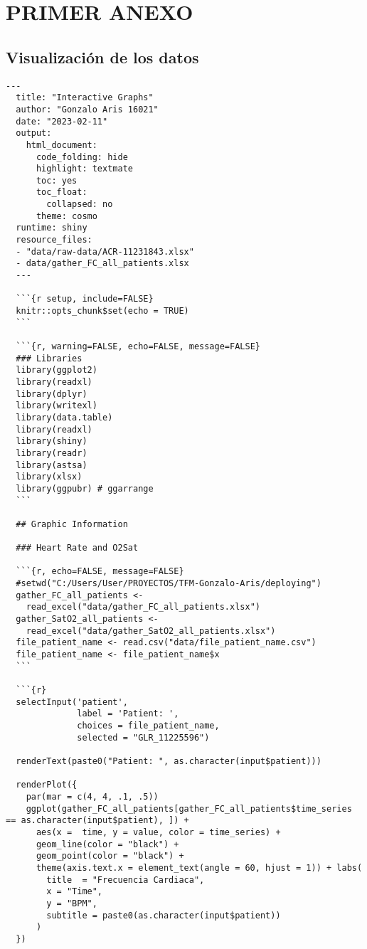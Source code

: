 \section{PRIMER ANEXO}\label{sec:anexo1}

\subsection{Visualización de los datos}\label{sec:codigo-visualizacion}
\lstset{style=mystyle2} 
\begin{lstlisting}[style=mystyle2,caption={Código Visualización de los Datos}, label={lst:codigo-visualizacion}]
  ---
  title: "Interactive Graphs"
  author: "Gonzalo Aris 16021"
  date: "2023-02-11"
  output:
    html_document:
      code_folding: hide
      highlight: textmate
      toc: yes
      toc_float:
        collapsed: no
      theme: cosmo
  runtime: shiny
  resource_files:
  - "data/raw-data/ACR-11231843.xlsx"
  - data/gather_FC_all_patients.xlsx
  ---
  
  ```{r setup, include=FALSE}
  knitr::opts_chunk$set(echo = TRUE)
  ```
  
  ```{r, warning=FALSE, echo=FALSE, message=FALSE}
  ### Libraries
  library(ggplot2)
  library(readxl)
  library(dplyr)
  library(writexl)
  library(data.table)
  library(readxl)
  library(shiny)
  library(readr)
  library(astsa)
  library(xlsx)
  library(ggpubr) # ggarrange
  ```
  
  ## Graphic Information
  
  ### Heart Rate and O2Sat
  
  ```{r, echo=FALSE, message=FALSE}
  #setwd("C:/Users/User/PROYECTOS/TFM-Gonzalo-Aris/deploying")
  gather_FC_all_patients <-
    read_excel("data/gather_FC_all_patients.xlsx")
  gather_SatO2_all_patients <-
    read_excel("data/gather_SatO2_all_patients.xlsx")
  file_patient_name <- read.csv("data/file_patient_name.csv")
  file_patient_name <- file_patient_name$x 
  ```
  
  ```{r}
  selectInput('patient',
              label = 'Patient: ',
              choices = file_patient_name,
              selected = "GLR_11225596")
  
  renderText(paste0("Patient: ", as.character(input$patient)))
  
  renderPlot({
    par(mar = c(4, 4, .1, .5))
    ggplot(gather_FC_all_patients[gather_FC_all_patients$time_series == as.character(input$patient), ]) +
      aes(x =  time, y = value, color = time_series) +
      geom_line(color = "black") +
      geom_point(color = "black") +
      theme(axis.text.x = element_text(angle = 60, hjust = 1)) + labs(
        title  = "Frecuencia Cardiaca",
        x = "Time",
        y = "BPM",
        subtitle = paste0(as.character(input$patient))
      )
  })
  

\end{lstlisting}
